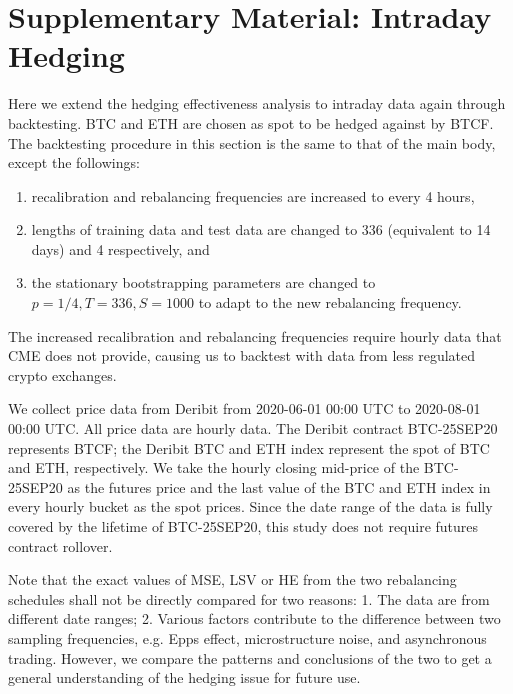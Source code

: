 \documentclass[11pt,a4paper,english]{article}
\begin{document}
\section{Supplementary Material: Intraday Hedging}\label{sec:intraday}
Here we extend the hedging effectiveness analysis to intraday data again through backtesting.
BTC and ETH are chosen as spot to be hedged against by BTCF. 
The backtesting procedure in this section is the same to that of the main body, except the followings:
\begin{enumerate}
  \item recalibration and rebalancing frequencies are increased to every 4 hours,
  \item lengths of training data and test data are changed to 336 (equivalent to 14 days) and 4 respectively, and
  \item the stationary bootstrapping parameters are changed to $p=1/4, T=336, S=1000$ to adapt to the new rebalancing frequency. 
\end{enumerate}

The increased recalibration and rebalancing frequencies require hourly data that CME does not provide, 
causing us to backtest with data from less regulated crypto exchanges.

We collect price data from Deribit from 2020-06-01 00:00 UTC to 2020-08-01 00:00 UTC. 
All price data are hourly data.
The Deribit contract BTC-25SEP20 represents BTCF;
the Deribit BTC and ETH index represent the spot of BTC and ETH, respectively.
We take the hourly closing mid-price of the BTC-25SEP20 as the futures price and the last value of the BTC and ETH index in every hourly bucket as the spot prices.
Since the date range of the data is fully covered by the lifetime of BTC-25SEP20, this study does not require futures contract rollover.

Note that the exact values of MSE, LSV or HE from the two rebalancing schedules shall not be directly compared for two reasons: 1. The data are from different date ranges; 2. Various factors contribute to the difference between two sampling frequencies, e.g. Epps effect, microstructure noise,
and asynchronous trading.
However, we compare the patterns and conclusions of the two to get a general understanding of the hedging issue for future use.
\end{document}
